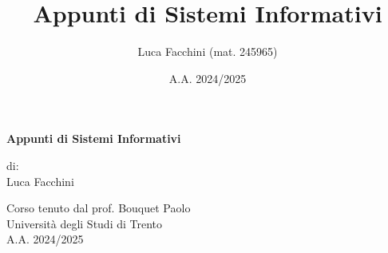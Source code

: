 \documentclass[twoside,a4paper]{report}
\title{Appunti di Sistemi Informativi}
\author{Luca Facchini (mat. 245965)}
\date{A.A. 2024/2025}
\begin{document}

    \begin{titlepage}
        \centering  %
        {\Huge\textbf{Appunti di Sistemi Informativi}} \\[1cm] %
        \vspace{1.5cm}
        
        {\normalsize di: } \\[.3cm]
        {\Large Luca Facchini} \\ %
        \vspace{1.5cm}
        
        {\large Corso tenuto dal prof. Bouquet Paolo} \\[0.3cm] %
        {\large Università degli Studi di Trento} \\[1.5cm]
        
        {\large A.A. 2024/2025} \\[3cm] %
        
        \vfill


\end{titlepage}
\end{document}
